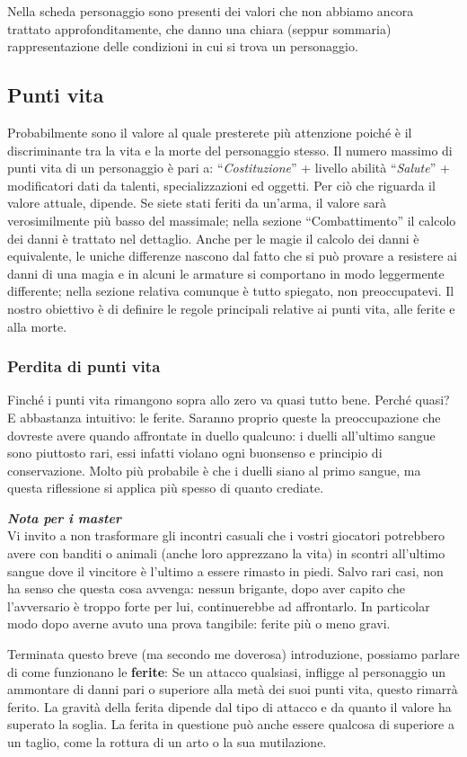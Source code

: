 \documentclass[../manuale_main.tex]{subfiles}
\begin{document}
Nella scheda personaggio sono presenti dei valori che non abbiamo ancora trattato approfonditamente, che danno una chiara (seppur sommaria) rappresentazione delle condizioni in cui si trova un personaggio.

\subsection{Punti vita}
Probabilmente sono il valore al quale presterete più attenzione poiché è il discriminante tra la vita e la morte del personaggio stesso.
Il numero massimo di punti vita di un personaggio è pari a: ``\emph{Costituzione}'' + livello abilità ``\emph{Salute}'' + modificatori dati da talenti, specializzazioni ed oggetti.
Per ciò che riguarda il valore attuale, dipende. Se siete stati feriti da un’arma, il valore sarà verosimilmente più basso del massimale; nella sezione ``Combattimento'' il calcolo dei danni è trattato nel dettaglio. Anche per le magie il calcolo dei danni è equivalente, le uniche differenze nascono dal fatto che si può provare a resistere ai danni di una magia e in alcuni le armature si comportano in modo leggermente differente; nella sezione relativa comunque è tutto spiegato, non preoccupatevi.
Il nostro obiettivo è di definire le regole principali relative ai punti vita, alle ferite e alla morte.
\subsubsection{Perdita di punti vita}
Finché i punti vita rimangono sopra allo zero va quasi tutto bene. Perché quasi? E abbastanza intuitivo: le ferite.
Saranno proprio queste la preoccupazione che dovreste avere quando affrontate in duello qualcuno: i duelli all’ultimo sangue sono piuttosto rari, essi infatti violano ogni buonsenso e principio di conservazione. Molto più probabile è che i duelli siano al primo sangue, ma questa riflessione si applica più spesso di quanto crediate. 
\begin{framed}
\textbf{\textit{Nota per i master}}\\
Vi invito a non trasformare gli incontri casuali che i vostri giocatori potrebbero avere con banditi o animali (anche loro apprezzano la vita) in scontri all’ultimo sangue dove il vincitore è l’ultimo a essere rimasto in piedi. Salvo rari casi, non ha senso che questa cosa avvenga: nessun brigante, dopo aver capito che l’avversario è troppo forte per lui, continuerebbe ad affrontarlo. In particolar modo dopo averne avuto una prova tangibile: ferite più o meno gravi. 
\end{framed}
Terminata questo breve (ma secondo me doverosa) introduzione, possiamo parlare di come funzionano le \textbf{ferite}:
Se un attacco qualsiasi, infligge al personaggio un ammontare di danni pari o superiore alla metà dei suoi punti vita, questo rimarrà ferito. La gravità della ferita dipende dal tipo di attacco e da quanto il valore ha superato la soglia. La ferita in questione può anche essere qualcosa di superiore a un taglio, come la rottura di un arto o la sua mutilazione.\\
\end{document}
